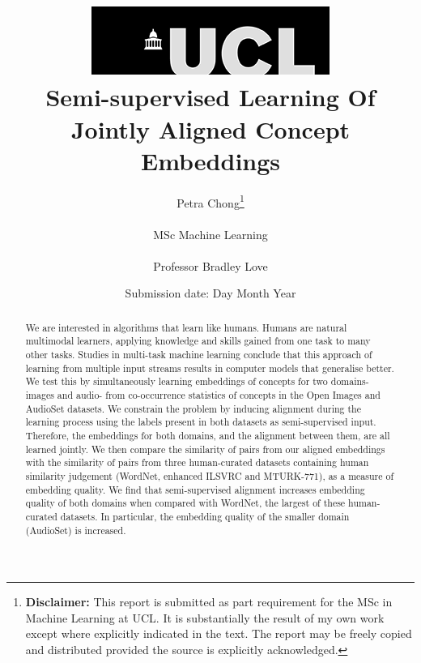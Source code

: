 \documentclass[12pt]{report}
\begin{document}
\title{  	{ \includegraphics[scale=.5]{ucl_logo.png}}\\
{{\Huge Semi-supervised Learning Of Jointly Aligned Concept Embeddings}}\\
		}
\date{Submission date: Day Month Year}
\author{Petra Chong\thanks{
{\bf Disclaimer:}
This report is submitted as part requirement for the MSc in Machine Learning at UCL. It is
substantially the result of my own work except where explicitly indicated in the text.
The report may be freely copied and distributed provided the source is explicitly acknowledged.
}
\\ \\
MSc Machine Learning\\ \\
Professor Bradley Love}

 
\onehalfspacing
\maketitle
\begin{abstract}
We are interested in algorithms that learn like humans. Humans are natural multimodal learners, applying knowledge and skills gained from one task to many other tasks. Studies in multi-task machine learning conclude that this approach of learning from multiple input streams results in computer models that generalise better. We test this by simultaneously learning embeddings of concepts for two domains- images and audio- from co-occurrence statistics of concepts in the Open Images and AudioSet datasets. We constrain the problem by inducing alignment during the learning process using the labels present in both datasets as semi-supervised input. Therefore, the embeddings for both domains, and the alignment between them, are all learned jointly. We then compare the similarity of pairs from our aligned embeddings with the similarity of pairs from three human-curated datasets containing human similarity judgement (WordNet, enhanced ILSVRC and MTURK-771), as a measure of embedding quality. We find that semi-supervised alignment increases embedding quality of both domains when compared with WordNet, the largest of these human-curated datasets. In particular, the embedding quality of the smaller domain (AudioSet) is increased. 
\end{abstract}
\end{document}
